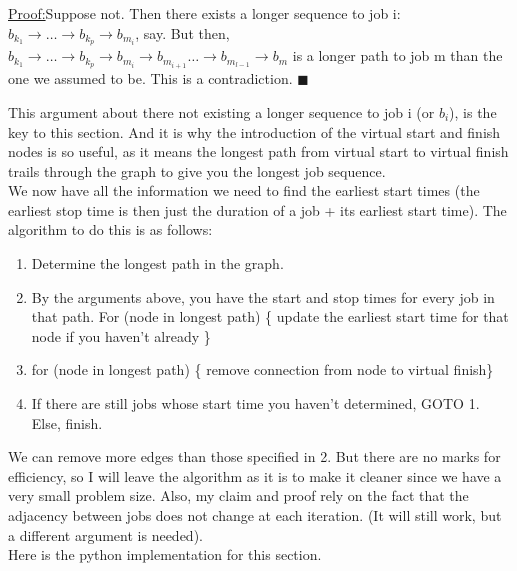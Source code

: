 \documentclass[paper=a4, fontsize=12pt]{scrartcl} %
\newenvironment{claimproof}[1]{\par\noindent\underline{Proof:}\space#1}{\hfill $\blacksquare$}
\numberwithin{equation}{section}       %
\numberwithin{figure}{section}         %
\numberwithin{table}{section}          %
\begin{document}
\begin{claimproof}
Suppose not. Then there exists a longer sequence to job i: $b_{k_{1}} \to \dots \to b_{k_{p}} \to b_{m_{i}}$, say. But then, $b_{k_{1}} \to \dots \to b_{k_{p}} \to b_{m_{i}} \to b_{m_{i+1}} \dots \to b_{m_{l-1}} \to b_{m}$ is a longer path to job m than the one we assumed to be. This is a contradiction.
\end{claimproof}

This argument about there not existing a longer sequence to job i (or $b_{i}$), is the key to this section. And it is why the introduction of the virtual start and finish nodes is so useful, as it means the longest path from virtual start to virtual finish trails through the graph to give you the longest job sequence. \\ 

We now have all the information we need to find the earliest start times (the earliest stop time is then just the duration of a job + its earliest start time). The algorithm to do this is as follows:

\begin{enumerate}
\item Determine the longest path in the graph.
\item  By the arguments above, you have the start and stop times for every job in that path. For (node in longest path) \{ update the earliest start time for that node if you haven't already \}
\item for (node in longest path) \{ remove connection from node to virtual finish\}
\item If there are still jobs whose start time you haven't determined, GOTO 1. Else, finish.
\end{enumerate}

\bcattention \quad We can remove more edges than those specified in 2. But there are no marks for efficiency, so I will leave the algorithm as it is to make it cleaner since we have a very small problem size. Also, my claim and proof rely on the fact that the adjacency between jobs does not change at each iteration. (It will still work, but a different argument is needed). \\

Here is the python implementation for this section.
\end{document}
